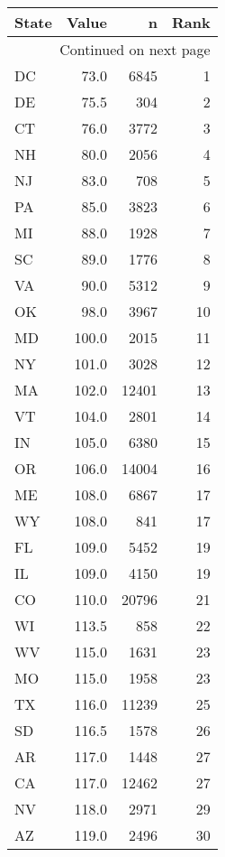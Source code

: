 \begin{longtable}{lrrr}
\toprule
State &  Value &  n &  Rank \\
\midrule
\endhead
\midrule
\multicolumn{4}{r}{{Continued on next page}} \\
\midrule
\endfoot

\bottomrule
\endlastfoot
DC    &    73.0 &   6845 &     1 \\
DE    &    75.5 &    304 &     2 \\
CT    &    76.0 &   3772 &     3 \\
NH    &    80.0 &   2056 &     4 \\
NJ    &    83.0 &    708 &     5 \\
PA    &    85.0 &   3823 &     6 \\
MI    &    88.0 &   1928 &     7 \\
SC    &    89.0 &   1776 &     8 \\
VA    &    90.0 &   5312 &     9 \\
OK    &    98.0 &   3967 &    10 \\
MD    &   100.0 &   2015 &    11 \\
NY    &   101.0 &   3028 &    12 \\
MA    &   102.0 &  12401 &    13 \\
VT    &   104.0 &   2801 &    14 \\
IN    &   105.0 &   6380 &    15 \\
OR    &   106.0 &  14004 &    16 \\
ME    &   108.0 &   6867 &    17 \\
WY    &   108.0 &    841 &    17 \\
FL    &   109.0 &   5452 &    19 \\
IL    &   109.0 &   4150 &    19 \\
CO    &   110.0 &  20796 &    21 \\
WI    &   113.5 &    858 &    22 \\
WV    &   115.0 &   1631 &    23 \\
MO    &   115.0 &   1958 &    23 \\
TX    &   116.0 &  11239 &    25 \\
SD    &   116.5 &   1578 &    26 \\
AR    &   117.0 &   1448 &    27 \\
CA    &   117.0 &  12462 &    27 \\
NV    &   118.0 &   2971 &    29 \\
AZ    &   119.0 &   2496 &    30 \\

\end{longtable}
